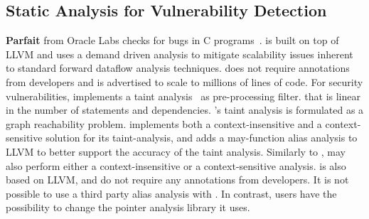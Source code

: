 \begin{comment}
\paragraph{Context-Sensitivity}

\subsection{Dynamic Analysis}
Dynamic analysis performs on running programs, and in general
do not need access to the source code of the program under analysis
\cite{Kiezun:2009:Ardilla, Clause:2007:Dytan, Balzarotti:2008:SCS4}.
A dynamic analysis is interprocedural and context-sensitive in
nature because it runs along with the analyzed program. 

A dynamic taint analysis instrument program memory locations
that correspond to taint sources, taint sinks, and where taint
propagation shall occur. For managed languages (e.g. Java, C\#),
developers may also choose to instrument programs at the level
of the virtual machine or runtime system. \cite{Livshits:2012:DTTMR}
provides a taxonomy on the topic. 
The major bottleneck of dynamic analysis lies in the execution
overhead that incurs the program instrumentation.

\textit{Forward symbolic execution} is a technique that builds
a logical formula to represent a program execution. The logical
formula enables developers to reason about different program input.
It is common to combine forward symbolic execution and dynamic
taint analysis. \cite{Schwartz:2010:YEW} discusses
this combination and possible implementation choices.
\end{comment}

\subsection{Static Analysis for Vulnerability Detection}


\textbf{Parfait} from Oracle Labs checks for bugs
in C programs~\cite{Parfait:2008}. \parfait is built on top
of LLVM and uses a demand driven analysis to mitigate
scalability issues inherent to standard forward dataflow
analysis techniques.	
\parfait does not require annotations from developers and
is advertised to scale to millions of lines of code. 
For security vulnerabilities, \parfait implements a taint
analysis~\cite{Scholz:2008:UDA} as pre-processing filter.
that is linear in the number of statements and dependencies.
\parfait's taint analysis is formulated as a graph reachability
problem. \parfait implements both a context-insensitive and
a context-sensitive solution for its taint-analysis, and 
adds a may-function alias analysis to LLVM to better support
the accuracy of the taint analysis.
Similarly to \parfait, \waint may also perform either a
context-insensitive or a context-sensitive analysis. \waint
is also based on LLVM, and do not require any annotations
from developers.
It is not possible to use a third party alias analysis with
\parfait. In contrast, \waint users have the possibility to
change the pointer analysis library it uses.\\

